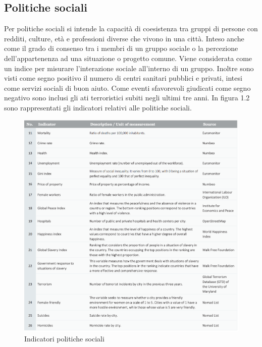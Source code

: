 \subsection{Politiche sociali}
Per politiche sociali si intende la capacità di coesistenza tra gruppi di persone con redditi, culture, età e professioni diverse che vivono in una città. Inteso anche come il grado di consenso tra i membri di un gruppo sociale o la percezione dell'appartenenza ad una situazione o progetto comune. Viene considerata come un indice per misurare l'interazione sociale all'interno di un gruppo. Inoltre sono visti come segno positivo il numero di centri sanitari pubblici e privati, intesi come servizi sociali di buon aiuto. Come eventi sfavorevoli giudicati come segno negativo sono inclusi gli ati terroristici subiti negli ultimi tre anni.
In figura 1.2 sono rappresentati gli indicatori relativi alle politiche sociali.
\begin{figure}[ht]
	\begin{center}
		\includegraphics[width=320bp]{img/indicatori_coesione_sociale.png}
		\caption{Indicatori politiche sociali}
	\end{center}
\end{figure}

